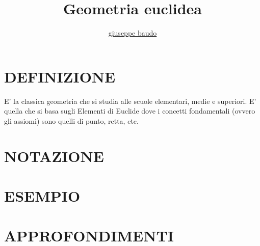\documentclass[a4paper,10pt]{article}
\title{Geometria euclidea}
\author{\href{http://www.baudo.hol.es}{giuseppe baudo}}
\begin{document}
\maketitle

\section{DEFINIZIONE}
E' la classica geometria che si studia alle scuole elementari, medie e superiori. E' quella che si basa sugli Elementi di Euclide dove
i concetti fondamentali (ovvero gli assiomi) sono quelli di punto, retta, etc.

\section{NOTAZIONE}

\section{ESEMPIO}

\section{APPROFONDIMENTI}
\end{document}
